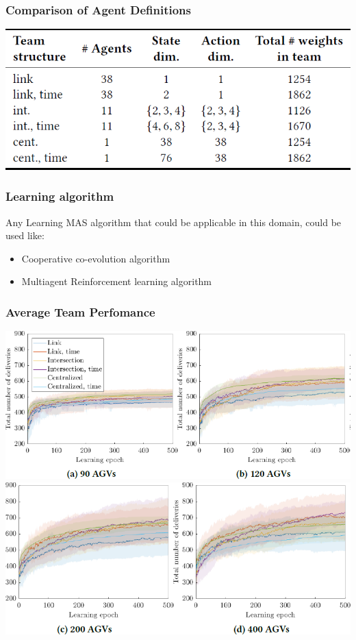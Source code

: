 \documentclass{beamer}
\begin{document}
	\begin{frame}
	\frametitle{Comparison of Agent Definitions}
	\begin{center}
    \includegraphics[width=1\textwidth]{comp.png}
	\end{center}
	\end{frame}
	
	\begin{frame}
			\frametitle{Learning algorithm}
			Any Learning MAS algorithm that could be applicable in this
			domain, could be used like:
			\begin{itemize}
				\item{Cooperative co-evolution algorithm}
				\item{Multiagent Reinforcement learning algorithm}
			\end{itemize}
	\end{frame}

	\begin{frame}
	\frametitle{Average Team Perfomance}
	\begin{center}
		\includegraphics[height=0.425\textheight]{graph2.png}
		\includegraphics[height=0.425\textheight ]{graph1.png}
	\end{center}
	\end{frame}
	
\end{document}
